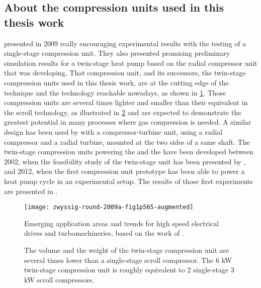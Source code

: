 \subsection{About the compression units used in this thesis work}
\label{sec:sota-jurg-cp}

\citet{Schiffmann-Favrat-2009a} presented in 2009 really encouraging
experimental results with the testing of a single-stage compression
unit. They also presented promising preliminary simulation results for
a twin-stage heat pump based on the radial compressor unit that
\citet{schiffmann-2008a} was developing. That compression unit, and
its successors, the twin-stage compression units used in this thesis
work, are at the cutting edge of the technique and the technology
reachable nowadays, as shown in \cref{fig:zwyssig}. Those compression
units are several times lighter and smaller than their equivalent in
the scroll technology, as illustrated in
\cref{fig:cp-unit-volume-comparison} and are expected to demonstrate
the greatest potential in many processes where gas compression is
needed. A similar design has been used by
\citet{demierre-wegele-2014a} with a compressor-turbine unit, using a
radial compressor and a radial turbine, mounted at the two sides of a
same shaft. The twin-stage
compression units powering the \AWP{} and the \BWP{} have been
developed between 2002, when the feasibility study of the twin-stage
unit has been presented by \citet{schiffmann-godat-2002a}, and 2012,
when the first compression unit prototype has been able to power a
heat pump cycle in an experimental setup. The results of those first
experiments are presented in .

\begin{figure}[htbp]
  \centering
  \texttt{[image: zwyssig-round-2009a-fig1p565-augmented]}
  \caption[Trends for high speed electrical drives and
  turbomachineries.]
  {Emerging application areas and trends for high speed electrical
    drives and turbomachineries, based on the work of \citet[Fig.\,1,
    p.\,565]{zwyssig-round-2009a}.}
  \label{fig:zwyssig}
\end{figure}

\begin{figure}[htbp]
  \centering {}
  \hspace{1em} 
  \caption[Volume of the twin-stage compression unit]{The volume and
    the weight of the twin-stage compression unit are several times
    lower than a single-stage scroll compressor. The 6 kW twin-stage
    compression unit is roughly equivalent to 2 single-stage 3 kW
    scroll compressors.}
  \label{fig:cp-unit-volume-comparison}
\end{figure}

